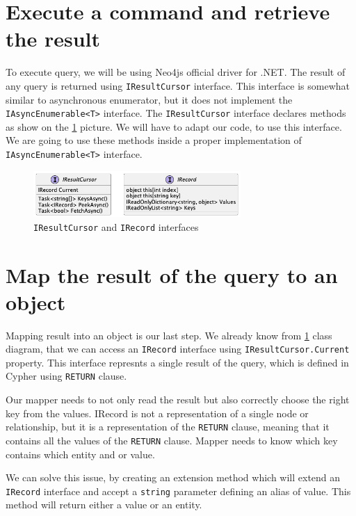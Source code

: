 \section{Execute a command and retrieve the result}

To execute query, we will be using Neo4js official driver for .NET. The result of any query
is returned using \texttt{IResultCursor} interface. This interface is somewhat similar to asynchronous
enumerator, but it does not implement the \texttt{IAsyncEnumerable<T>} interface. The \texttt{IResultCursor} interface
declares methods as show on the \ref{fig:iresinterface} picture. We will have to adapt our code, to use this interface.
We are going to use these methods inside a proper implementation of \texttt{IAsyncEnumerable<T>}
interface.

\begin{figure}[H]
    \centering
    \includegraphics[width=0.7\textwidth]{content/IResultCursor.png}
    \caption{\texttt{IResultCursor} and \texttt{IRecord} interfaces}
    \label{fig:iresinterface}
\end{figure}

\section{Map the result of the query to an object}

Mapping result into an object is our last step. We already know from \ref{fig:iresinterface} class diagram,
that we can access an \texttt{IRecord} interface using \texttt{IResultCursor.Current} property.
This interface represnts a single result of the query, which is defined in Cypher using \texttt{RETURN} clause.

Our mapper needs to not only read the result but also correctly choose the right key from the values. IRecord is not a representation of a single node
or relationship, but it is a representation of the \texttt{RETURN} clause, meaning that it contains all the values of the \texttt{RETURN} clause.
Mapper needs to know which key contains which entity and or value.

We can solve this issue, by creating an extension method which will extend an \texttt{IRecord} interface and accept a \texttt{string} parameter defining an alias of value.
This method will return either a value or an entity.

